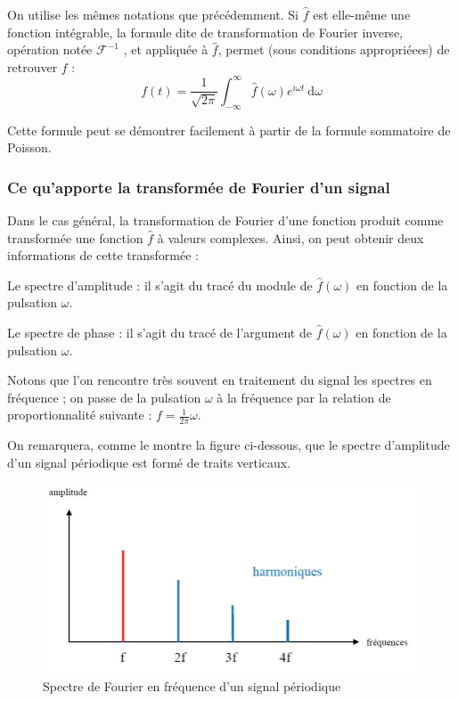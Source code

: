 On utilise les mêmes notations que précédemment.
Si $\hat{f}$ est elle-même une fonction intégrable, la formule dite de transformation de Fourier inverse, opération notée $\mathcal{F}^{-1}$ , et appliquée à $\hat{f}$, permet (sous conditions appropriéees) de retrouver $f$ :
$$ f(t)=\displaystyle{\frac{1}{\sqrt{2\pi}}\int_{-\infty}^{\infty}\hat{f}(\omega)e^{i\omega t}\:\mathrm{d}\omega}$$

Cette formule peut se démontrer facilement à partir de la formule sommatoire de Poisson.

\subsubsection{Ce qu'apporte la transformée de Fourier d'un signal}
Dans le cas général, la transformation de Fourier d'une fonction produit comme transformée une fonction $\hat{f}$ à valeurs complexes. Ainsi, on peut obtenir deux informations de cette transformée :

Le spectre d'amplitude : il s'agit du tracé du module de $\hat{f}(\omega)$ en fonction de la pulsation $\omega$.

Le spectre de phase :  il s'agit du tracé de l'argument de $\hat{f}(\omega)$ en fonction de la pulsation $\omega$.

Notons que l'on rencontre très souvent en traitement du signal les spectres en fréquence ; on passe de la pulsation $\omega$ à la fréquence par la relation de proportionnalité suivante : $f=\displaystyle \frac{1}{2\pi}\omega $.

On remarquera, comme le montre la figure ci-dessous, que le spectre d'amplitude d'un signal périodique est formé de traits verticaux.
\begin{figure}[!h]
\centering
\includegraphics[scale=0.4]{images/spectre.jpg}
\caption{Spectre de Fourier en fréquence d'un signal périodique}
\end{figure}

